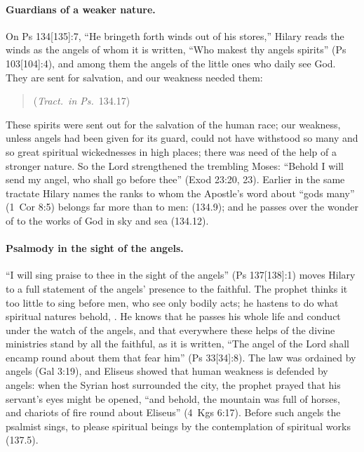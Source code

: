 \paragraph{Guardians of a weaker nature.} On Ps 134[135]:7, ``He bringeth
forth winds out of his stores,'' Hilary reads the winds as the angels of
whom it is written, ``Who makest thy angels spirits'' (Ps 103[104]:4), and
among them the angels of the
little ones who daily see God. They are sent for salvation, and our
weakness needed them:
\begin{quote}
 (\emph{Tract.\ in Ps.}\ 134.17)
\end{quote}
\noindent These spirits were sent out for the salvation of the human race;
our weakness, unless angels had been given for its guard, could not have
withstood so many and so great spiritual wickednesses in high places;
there was need of the help of a stronger nature. So the Lord strengthened
the trembling Moses: ``Behold I will send my angel, who shall go before
thee'' (Exod 23:20, 23). Earlier in the same tractate Hilary names the
ranks to whom the Apostle's word about ``gods many'' (1~Cor 8:5) belongs
far more than to men:  (134.9); and he passes over
the wonder of  to the works of God in
sky and sea (134.12).

\paragraph{Psalmody in the sight of the angels.} ``I will sing praise to
thee in the sight of the angels'' (Ps 137[138]:1) moves Hilary to a
full statement of the angels' presence to the faithful. The prophet
thinks it too little to sing before men, who see only bodily acts; he
hastens to do what spiritual natures behold, . He knows that he
passes his whole life and conduct under the watch of the angels, and that
everywhere these helps of the divine ministries stand by all the faithful,
as it is written, ``The angel of the Lord shall encamp round about them
that fear him'' (Ps 33[34]:8). The law was ordained by angels (Gal
3:19), and Eliseus showed that human weakness is defended by angels: when
the Syrian host surrounded the city, the prophet prayed that his servant's
eyes might be opened, ``and behold, the mountain was full of horses, and
chariots of fire round about Eliseus'' (4~Kgs 6:17). Before such angels
the psalmist sings, to please spiritual beings by the contemplation of
spiritual works (137.5).


